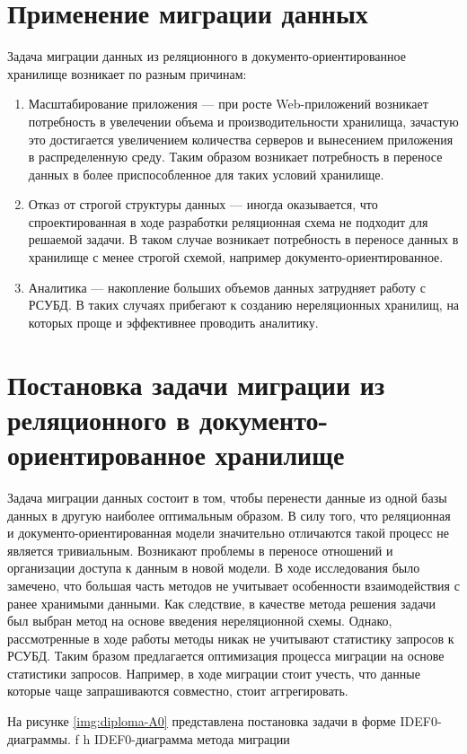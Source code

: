 \section{Применение миграции данных}
Задача миграции данных из реляционного в документо-ориентированное хранилище возникает по разным причинам:
\begin{enumerate}
    \item Масштабирование приложения --- при росте Web-приложений возникает потребность в увелечении объема и производительности хранилища,
    зачастую это достигается увеличением количества серверов и вынесением приложения в распределенную среду.
    Таким образом возникает потребность в переносе данных в более приспособленное для таких условий хранилище.
    
    \item Отказ от строгой структуры данных --- иногда оказывается, что спроектированная в ходе разработки реляционная схема не подходит для решаемой задачи.
    В таком случае возникает потребность в переносе данных в хранилище с менее строгой схемой, например документо-ориентированное.

    \item Аналитика --- накопление больших объемов данных затрудняет работу с РСУБД.
    В таких случаях прибегают к созданию нереляционных хранилищ, на которых проще и эффективнее проводить аналитику.
\end{enumerate}

\clearpage

\section{Постановка задачи миграции из реляционного в документо-ориентированное хранилище}
Задача миграции данных состоит в том, 
чтобы перенести данные из одной базы данных в другую наиболее оптимальным образом.
В силу того, что реляционная и документо-ориентированная модели
значительно отличаются такой процесс не является тривиальным.
Возникают проблемы в переносе отношений и организации доступа к данным в новой модели.
В ходе исследования было замечено, что большая часть методов не
учитывает особенности взаимодействия с ранее хранимыми данными.
Как следствие, в качестве метода решения задачи был выбран метод на основе введения нереляционной схемы.
Однако, рассмотренные в ходе работы методы никак не учитывают статистику запросов к РСУБД. 
Таким бразом предлагается оптимизация процесса миграции на основе статистики запросов.
Например, в ходе миграции стоит учесть, что данные которые чаще запрашиваются совместно, стоит аггрегировать.

На рисунке \ref{img:diploma-A0} представлена постановка задачи в форме IDEF0-
диаграммы.
    {f}
    {h}
    {\textwidth}
    {IDEF0-диаграмма метода миграции}
